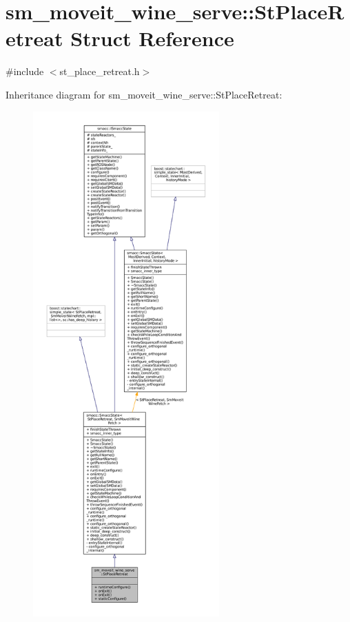 \hypertarget{structsm__moveit__wine__serve_1_1StPlaceRetreat}{}\section{sm\+\_\+moveit\+\_\+wine\+\_\+serve\+:\+:St\+Place\+Retreat Struct Reference}
\label{structsm__moveit__wine__serve_1_1StPlaceRetreat}


{\ttfamily \#include $<$st\+\_\+place\+\_\+retreat.\+h$>$}



Inheritance diagram for sm\+\_\+moveit\+\_\+wine\+\_\+serve\+:\+:St\+Place\+Retreat\+:
\nopagebreak
\begin{figure}[H]
\begin{center}
\leavevmode
\includegraphics[height=550pt]{structsm__moveit__wine__serve_1_1StPlaceRetreat__inherit__graph}
\end{center}
\end{figure}


